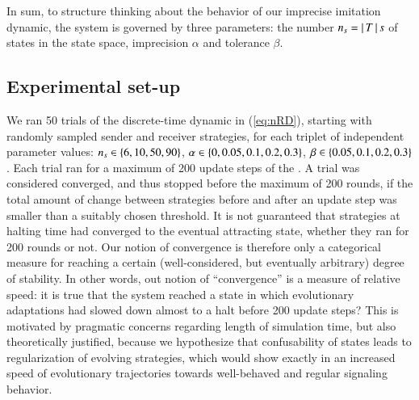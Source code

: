 \documentclass[fleqn,reqno,10pt]{article}
\newcommand{\rdd}{\acro{rdd}} %
\newcommand{\imprecision}{\ensuremath{\alpha}} %
\newcommand{\toler}{\ensuremath{\beta}} %
\newcommand{\ns}{\ensuremath{n_s}} %
\begin{document}
In sum, to structure thinking about the behavior of our imprecise imitation dynamic, the system
is governed by three parameters: the number $\ns = \card{T}s$ of states in the state space,
imprecision $\imprecision$ and tolerance $\toler$.


\subsection{Experimental set-up}
\label{sec:simulations}

We ran 50 trials of the discrete-time dynamic in (\ref{eq:nRD}), starting with randomly sampled
sender and receiver strategies, for each triplet of independent parameter values:
$\ns \in \set{6, 10, 50, 90}$, $\imprecision \in \set{0, 0.05, 0.1, 0.2, 0.3}$,
$\toler \in \set{0.05, 0.1, 0.2, 0.3}$. Each trial ran for a maximum of 200 update steps of the
\rdd. A trial was considered converged, and thus stopped before the maximum of 200 rounds, if
the total amount of change between strategies before and after an update step was smaller than
a suitably chosen threshold. It is not guaranteed that strategies at halting time had converged
to the eventual attracting state, whether they ran for 200 rounds or not. Our notion of
convergence is therefore only a categorical measure for reaching a certain (well-considered,
but eventually arbitrary) degree of stability. In other words, out notion of ``convergence'' is
a measure of relative speed: it is true that the system reached a state in which evolutionary
adaptations had slowed down almost to a halt before 200 update steps? This is motivated by
pragmatic concerns regarding length of simulation time, but also theoretically justified,
because we hypothesize that confusability of states leads to regularization of evolving
strategies, which would show exactly in an increased speed of evolutionary trajectories towards
well-behaved and regular signaling behavior.
\end{document}
